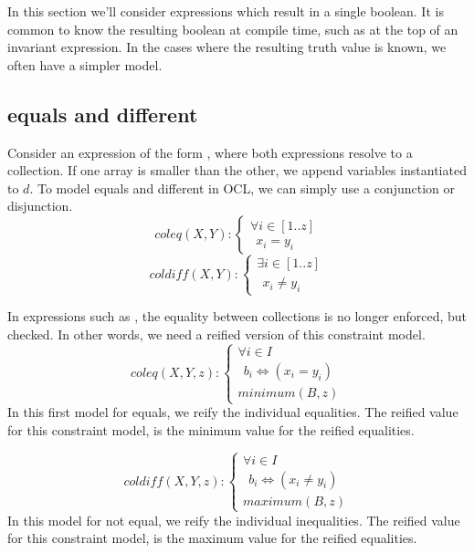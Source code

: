 In this section we'll consider expressions which result in a single boolean.
It is common to know the resulting boolean at compile time, such as at the top of an invariant expression.
In the cases where the resulting truth value is known, we often have a simpler model. 

\subsection{equals and different}
Consider an expression of the form , where both expressions resolve to a collection. If one array is smaller than the other, we append variables instantiated to $d$.
To model equals and different in OCL, we can simply use a conjunction or disjunction.  
\begin{equation}\label{csp:coleq}
    coleq(X,Y):
    \begin{cases}
        \forall i \in [1..z]\\
        ~~ x_i = y_i
    \end{cases}
\end{equation}
\begin{equation}\label{csp:coldiff}
    coldiff(X,Y):
    \begin{cases}
        \exists i \in [1..z]\\
        ~~ x_i \neq y_i
    \end{cases}
\end{equation}

In expressions such as , the equality between collections is no longer enforced, but checked. 
In other words, we need a reified version of this constraint model.
\begin{equation}\label{csp:coleq_reif}
    coleq(X,Y,z):
    \begin{cases}
        \forall i \in I\\
        ~~b_i \iff (x_i = y_i)\\
        minimum(B,z)
    \end{cases}
\end{equation}
In this first model for equals, we reify the individual equalities.
The reified value for this constraint model, is the minimum value for the reified equalities.

\begin{equation}\label{csp:coldiff_reif}
    coldiff(X,Y,z):
    \begin{cases}
        \forall i \in I\\
        ~~b_i \iff (x_i \neq y_i)\\
        maximum(B,z)
    \end{cases}
\end{equation}
In this model for not equal, we reify the individual inequalities.
The reified value for this constraint model, is the maximum value for the reified equalities.

